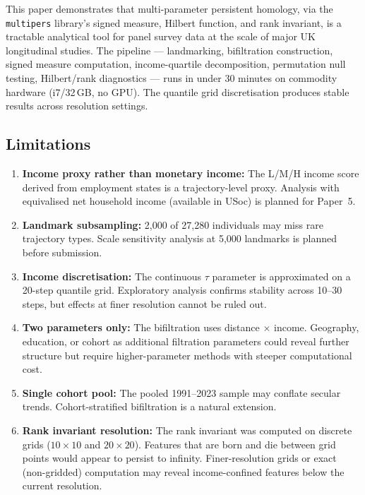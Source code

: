 This paper demonstrates that multi-parameter persistent homology, via the
\texttt{multipers} library's signed measure, Hilbert function, and rank
invariant, is a tractable analytical tool for panel survey data at the scale
of major UK longitudinal studies. The pipeline --- landmarking, bifiltration
construction, signed measure computation, income-quartile decomposition,
permutation null testing, Hilbert/rank diagnostics --- runs in under 30
minutes on commodity hardware (i7/32\,GB, no GPU). The quantile grid
discretisation produces stable results across resolution settings.

\subsection{Limitations}

\begin{enumerate}
  \item \textbf{Income proxy rather than monetary income:} The L/M/H income
    score derived from employment states is a trajectory-level proxy.
    Analysis with equivalised net household income (available in USoc) is
    planned for Paper~5.

  \item \textbf{Landmark subsampling:} 2,000 of 27,280 individuals may miss
    rare trajectory types. Scale sensitivity analysis at 5,000 landmarks is
    planned before submission.

  \item \textbf{Income discretisation:} The continuous $\tau$ parameter is
    approximated on a 20-step quantile grid. Exploratory analysis confirms
    stability across 10--30 steps, but effects at finer resolution cannot be
    ruled out.

  \item \textbf{Two parameters only:} The bifiltration uses distance $\times$
    income. Geography, education, or cohort as additional filtration
    parameters could reveal further structure but require higher-parameter
    methods with steeper computational cost.

  \item \textbf{Single cohort pool:} The pooled 1991--2023 sample may
    conflate secular trends. Cohort-stratified bifiltration is a natural
    extension.

  \item \textbf{Rank invariant resolution:} The rank invariant was computed
    on discrete grids ($10 \times 10$ and $20 \times 20$). Features that are
    born and die between grid points would appear to persist to infinity.
    Finer-resolution grids or exact (non-gridded) computation may reveal
    income-confined features below the current resolution.
\end{enumerate}


